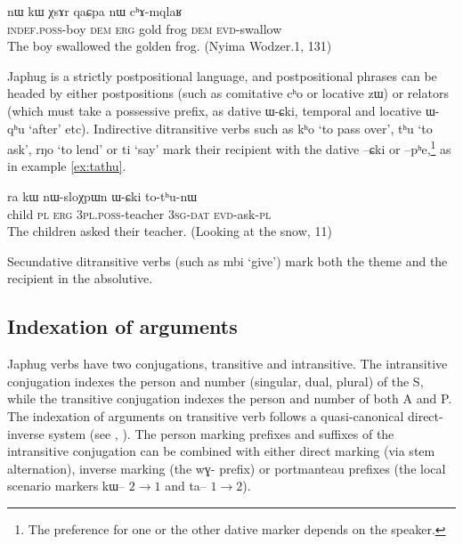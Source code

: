 \documentclass[oldfontcommands,oneside,a4paper,11pt]{article}
\newcommand{\ipa}[1]{{\phon #1}} %
\begin{document}
\begin{exe}
\ex \label{ex:erg}
\gll \ipa{tɤ-tɕɯ}  	\ipa{nɯ}  	\ipa{kɯ}  	\ipa{χsɤr}  	\ipa{qaɕpa}  	\ipa{nɯ}  	\ipa{cʰɤ-mqlaʁ}   \\
\textsc{indef.poss}-boy \textsc{dem} \textsc{erg} gold frog \textsc{dem} \textsc{evd}-swallow \\
\glt The boy swallowed the golden frog. (Nyima Wodzer.1, 131)
\end{exe}


Japhug is a strictly postpositional language, and postpositional phrases can be headed by either postpositions (such as comitative \ipa{cʰo} or locative \ipa{zɯ}) or relators (which must take a possessive prefix, as dative \ipa{ɯ-ɕki}, temporal and locative  \ipa{ɯ-qʰu} `after' etc). Indirective ditransitive verbs such as \ipa{kʰo} `to pass over', \ipa{tʰu} `to ask', \ipa{rŋo} `to lend' or \ipa{ti} `say' mark their recipient with the dative \ipa{--ɕki} or \ipa{--pʰe},\footnote{The preference for one or the other dative marker depends on the speaker.} as in example \ref{ex:tathu}. 

 \begin{exe}
   \ex   \label{ex:tathu}
 \gll \ipa{tɤpɤtso}  	\ipa{ra}  	\ipa{kɯ}  	\ipa{nɯ-sloχpɯn}  	\ipa{ɯ-ɕki}  	\ipa{to-tʰu-nɯ}  \\
child \textsc{pl} \textsc{erg} \textsc{3pl.poss}-teacher \textsc{3sg-dat} \textsc{evd}-ask-\textsc{pl} \\
\glt The children asked their teacher. (Looking at the snow, 11)
   \end{exe}  

Secundative  ditransitive verbs (such as \ipa{mbi} `give') mark both the theme and the recipient in the absolutive.
 

\subsection{Indexation of arguments}

Japhug verbs have two conjugations, transitive and intransitive. The intransitive conjugation indexes the person and number (singular, dual, plural) of the S, while the transitive conjugation indexes the person and number of both A and P. The indexation of arguments on transitive verb follows a quasi-canonical direct-inverse system (see \citealt{jacques10inverse}, \citealt{jacques14inverse}). The person marking prefixes and suffixes of the intransitive conjugation can be combined with either direct marking (via stem alternation), inverse marking (the \ipa{wɣ-} prefix) or portmanteau prefixes (the local scenario markers \ipa{kɯ--} $2\rightarrow1$ and \ipa{ta--} $1\rightarrow2$).
\end{document}
